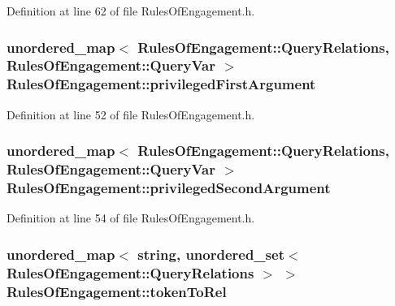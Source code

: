 Definition at line 62 of file Rules\-Of\-Engagement.\-h.

\hypertarget{class_rules_of_engagement_a7dd292534cee25afe99b1187a6e07774}{
\subsubsection[{privileged\-First\-Argument}]{\setlength{\rightskip}{0pt plus 5cm}unordered\-\_\-map$<$ {\bf Rules\-Of\-Engagement\-::\-Query\-Relations}, {\bf Rules\-Of\-Engagement\-::\-Query\-Var} $>$ Rules\-Of\-Engagement\-::privileged\-First\-Argument\hspace{0.3cm}{\ttfamily [static]}}}\label{class_rules_of_engagement_a7dd292534cee25afe99b1187a6e07774}


Definition at line 52 of file Rules\-Of\-Engagement.\-h.

\hypertarget{class_rules_of_engagement_acdc0a8ed701246134911b36aac249c6c}{
\subsubsection[{privileged\-Second\-Argument}]{\setlength{\rightskip}{0pt plus 5cm}unordered\-\_\-map$<$ {\bf Rules\-Of\-Engagement\-::\-Query\-Relations}, {\bf Rules\-Of\-Engagement\-::\-Query\-Var} $>$ Rules\-Of\-Engagement\-::privileged\-Second\-Argument\hspace{0.3cm}{\ttfamily [static]}}}\label{class_rules_of_engagement_acdc0a8ed701246134911b36aac249c6c}


Definition at line 54 of file Rules\-Of\-Engagement.\-h.

\hypertarget{class_rules_of_engagement_ae9b3fd791855b69fdf746d47df2b2bdd}{
\subsubsection[{token\-To\-Rel}]{\setlength{\rightskip}{0pt plus 5cm}unordered\-\_\-map$<$ string, unordered\-\_\-set$<$ {\bf Rules\-Of\-Engagement\-::\-Query\-Relations} $>$ $>$ Rules\-Of\-Engagement\-::token\-To\-Rel\hspace{0.3cm}{\ttfamily [static]}}}\label{class_rules_of_engagement_ae9b3fd791855b69fdf746d47df2b2bdd}


